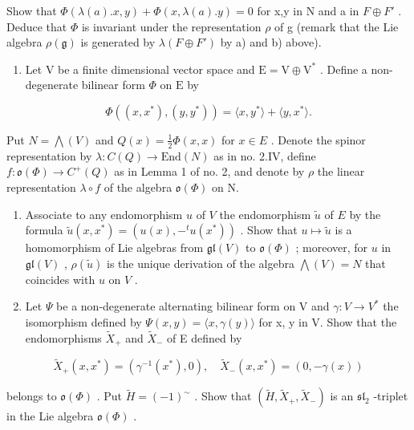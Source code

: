Show that \(\Phi(\lambda(a).x,y)+\Phi(x,\lambda(a).y)=0\) for x,y in N and a in \(F\oplus F'\) . Deduce that \(\Phi\) is invariant under the representation \(\rho\) of g (remark that the Lie algebra \(\rho(\mathfrak{g})\) is generated by \(\lambda(F\oplus F')\) by a) and b) above).

\begin{enumerate}
\def\labelenumi{\arabic{enumi})}
\setcounter{enumi}{18}
\tightlist
\item
  Let \(\mathrm{V}\) be a finite dimensional vector space and \(\mathrm{E} = \mathrm{V} \oplus \mathrm{V}^*\) . Define a non-degenerate bilinear form \(\varPhi\) on \(\mathrm{E}\) by
\end{enumerate}

\[
\Phi ((x, x ^ {*}), (y, y ^ {*})) = \langle x, y ^ {*} \rangle + \langle y, x ^ {*} \rangle .
\]

Put \(N = \bigwedge(V)\) and \(Q(x) = \frac{1}{2}\Phi(x, x)\) for \(x \in E\) . Denote the spinor representation by \(\lambda : C(Q) \to \text{End}(N)\) as in no. 2.IV, define \(f : \mathfrak{o}(\Phi) \to C^{+}(Q)\) as in Lemma 1 of no. 2, and denote by \(\rho\) the linear representation \(\lambda \circ f\) of the algebra \(\mathfrak{o}(\Phi)\) on N.

\begin{enumerate}
\def\labelenumi{\alph{enumi})}
\item
  Associate to any endomorphism \(u\) of \(V\) the endomorphism \(\tilde{u}\) of \(E\) by the formula \(\tilde{u}(x, x^{*}) = (u(x), -^{t}u(x^{*}))\) . Show that \(u \mapsto \tilde{u}\) is a homomorphism of Lie algebras from \(\mathfrak{gl}(V)\) to \(\mathfrak{o}(\varPhi)\) ; moreover, for \(u\) in \(\mathfrak{gl}(V)\) , \(\rho(\tilde{u})\) is the unique derivation of the algebra \(\bigwedge(V) = N\) that coincides with \(u\) on \(V\) .
\item
  Let \(\varPsi\) be a non-degenerate alternating bilinear form on V and \(\gamma: V \to V^{*}\) the isomorphism defined by \(\varPsi(x, y) = \langle x, \gamma(y) \rangle\) for x, y in V. Show that the endomorphisms \(\tilde{X}_{+}\) and \(\tilde{X}_{-}\) of E defined by
\end{enumerate}

\[
\tilde {X} _ {+} (x, x ^ {*}) = (\gamma^ {- 1} (x ^ {*}), 0), \quad \tilde {X} _ {-} (x, x ^ {*}) = (0, - \gamma (x))
\]

belongs to \(\mathfrak{o}(\varPhi)\) . Put \(\tilde{H} = (-1)^{\sim}\) . Show that \((\tilde{H}, \tilde{X}_{+}, \tilde{X}_{-})\) is an \(\mathfrak{sl}_2\) -triplet in the Lie algebra \(\mathfrak{o}(\varPhi)\) .

